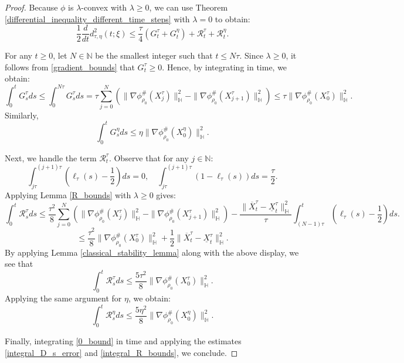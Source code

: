 \documentclass[11pt,a4paper]{amsart}
\newcommand{\1}{\mathds{1}}
\numberwithin{equation}{section}
\begin{document}
\begin{proof} Because $\phi$ is $\lambda$-convex with $\lambda \geq 0$, we can use Theorem \ref{differential_inequality_different_time_steps} with $\lambda = 0$ to obtain:
\begin{equation} 
\frac{1}{2} \frac{d}{dt} d^2_{\tau,\eta}(t;\xi) \leq \frac{\tau}{4} (G^{\tau}_t+G^{\eta}_t) + \mathcal{R}^{\tau}_t + \mathcal{R}^{\eta}_t.   
\label{0_bound} 
\end{equation}

For any $t \geq 0$, let $N \in \mathbb{N}$ be the smallest integer such that $t \leq N \tau$.  
Since $\lambda \geq 0$, it follows from \eqref{gradient_bounds} that $G^{\tau}_t \geq 0$.  Hence, by integrating in time, we obtain:
\begin{equation} 
\int_0^t G^{\tau}_s ds \leq \int_0^{N \tau} G^{\tau}_s ds = \tau \sum_{j=0}^{N} \left( \|\nabla \phi^{\#}_{\rho_0}(X^{\tau}_j)\|_{\mathbb{H}}^2 - \|\nabla \phi^{\#}_{\rho_0}(X^{\tau}_{j+1})\|_{\mathbb{H}}^2 \right) \leq \tau \|\nabla \phi^{\#}_{\rho_0}(X_0^{\tau})\|^2_{\mathbb{H}}.  
\label{integral_D_s_error} 
\end{equation} 
Similarly, 
\begin{equation} 
\int_0^t G^{\eta}_s ds \leq \eta \|\nabla \phi^{\#}_{\rho_0}(X_0^{\eta})\|^2_{\mathbb{H}}.
\end{equation}

Next, we handle the term $\mathcal{R}^{\tau}_t$. Observe that for any $j \in \mathbb{N}$:
\[
\int_{j \tau}^{(j+1)\tau} \left(\ell_{\tau}(s)-\frac{1}{2}\right) ds = 0, 
\quad \int_{j \tau}^{(j+1) \tau} (1-\ell_{\tau}(s)) ds = \frac{\tau}{2}.
\]
Applying Lemma \ref{R_bounds} with $\lambda \geq 0$ gives:
\[
\int_0^t \mathcal{R}^{\tau}_s ds \leq \frac{\tau^2}{8} \sum_{j=0}^{N} \left( \|\nabla \phi^{\#}_{\rho_0}(X_j^{\tau})\|^2_{\mathbb{H}} - \|\nabla \phi^{\#}_{\rho_0}(X_{j+1}^{\tau})\|^2_{\mathbb{H}} \right) -  \frac{\|\overline{X}^{\tau}_t-\underline{X}^{\tau}_t\|_{\mathbb{H}}^2}{\tau}  \int_{(N-1)\tau}^t \left(\ell_{\tau}(s)-\frac{1}{2}\right) ds.
\]
\[
 \leq \frac{\tau^2}{8} \|\nabla \phi^{\#}_{\rho_0}(X^{\tau}_{0})\|^2_{\mathbb{H}} + \frac{1}{2} \|\overline{X}^{\tau}_t-\underline{X}^{\tau}_t\|^2_{\mathbb{H}}.
\]
By applying Lemma \ref{classical_stability_lemma} along with the above display, we see that 
\begin{equation} 
\int_0^t \mathcal{R}^{\tau}_s ds \leq \frac{5\tau^2}{8} \|\nabla \phi^{\#}_{\rho_0}(X^{\tau}_{0})\|^2_{\mathbb{H}}.
\label{integral_R_bounds}   
\end{equation} 
Applying the same argument for $\eta$, we obtain:
\[
\int_0^t \mathcal{R}^{\eta}_s ds \leq \frac{5\eta^2}{8} \|\nabla \phi^{\#}_{\rho_0}(X^{\eta}_{0})\|^2_{\mathbb{H}}.
\]

Finally, integrating \eqref{0_bound} in time and applying the estimates \eqref{integral_D_s_error} and \eqref{integral_R_bounds}, we conclude.
\end{proof}
\end{document}
